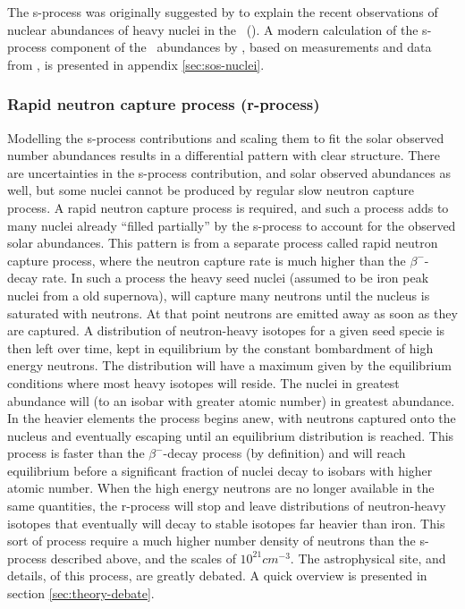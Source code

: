The s-process was originally suggested by  to explain the recent observations of nuclear abundances of heavy nuclei in the \sos\ ().
A modern calculation of the s-process component of the \sos\ abundances by , based on measurements and data from , is presented in appendix \ref{sec:sos-nuclei}.

\subsubsection{Rapid neutron capture process (r-process)} \label{sec:rncp}
Modelling the s-process contributions and scaling them to fit the solar observed number abundances results in a differential pattern with clear structure.
There are uncertainties in the s-process contribution, and solar observed abundances as well, but some nuclei cannot be produced by regular slow neutron capture process.
A rapid neutron capture process is required, and such a process adds to many nuclei already ``filled partially'' by the s-process to account for the observed solar abundances.
This pattern is from a separate process called rapid neutron capture process, where the neutron capture rate is much higher than the $\beta^-$-decay rate. In such a process the heavy seed nuclei (assumed to be iron peak nuclei from a old supernova), will capture many neutrons until the nucleus is saturated with neutrons.
At that point neutrons are emitted away as soon as they are captured.
A distribution of neutron-heavy isotopes for a given seed specie is then left over time, kept in equilibrium by the constant bombardment of high energy neutrons.
The distribution will have a maximum given by the equilibrium conditions where most heavy isotopes will reside.
The nuclei in greatest abundance will \betadecay (to an isobar with greater atomic number) in greatest abundance.
In the heavier elements the process begins anew, with neutrons captured onto the nucleus and eventually escaping until an equilibrium distribution is reached. This process is faster than the $\beta^-$-decay process (by definition) and will reach equilibrium before a significant fraction of nuclei decay to isobars with higher atomic number.
When the high energy neutrons are no longer available in the same quantities, the r-process will stop and leave distributions of neutron-heavy isotopes that eventually will decay to stable isotopes far heavier than iron.
This sort of process require a much higher number density of neutrons than the s-process described above, and the scales of $10^{21} cm^{-3}$.
The astrophysical site, and details, of this process, are greatly debated. A quick overview is presented in section \ref{sec:theory-debate}.

